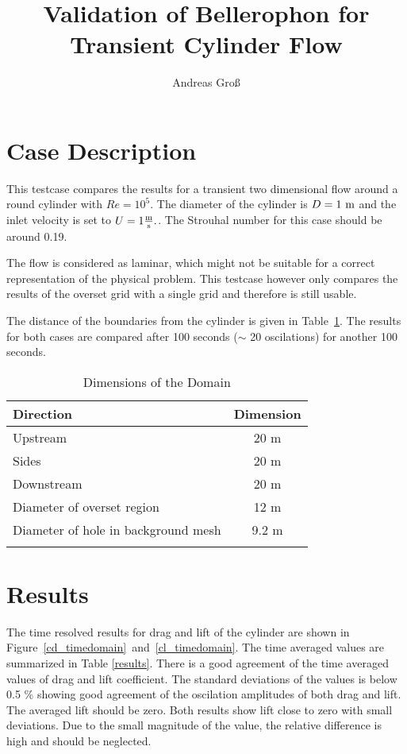 \documentclass[a4paper,10pt]{scrartcl}
\title{Validation of Bellerophon for Transient Cylinder Flow}
\author{Andreas Groß}
\begin{document}
\maketitle

\section{Case Description}
This testcase compares the results for a transient two dimensional flow around
a round cylinder with \(Re=10^5\). The diameter of the cylinder is
\(D=1\ \text m\) and the inlet velocity is set to
\(U=1\frac{\text m}{\text s}.\). The Strouhal number for this case should be
around 0.19.

The flow is considered as laminar, which might not be suitable for a correct
representation of the physical problem. This testcase however only compares the
results of the overset grid with a single grid and therefore is still
usable.

The distance of the boundaries from the cylinder is given in
Table~\ref{domain}. The results for both cases are compared after 100 seconds
(\(\sim\) 20 oscilations) for another 100 seconds.

\begin{table}[!htbp]
 \caption{Dimensions of the Domain}
 \centering
 \begin{tabular}{lc}
  \toprule
  Direction & Dimension \\
  \midrule
  Upstream & 20 m\\
  Sides & 20 m\\
  Downstream & 20 m\\
  Diameter of overset region & 12 m \\
  Diameter of hole in background mesh & 9.2 m \\
  \bottomrule
  \label{domain}
 \end{tabular}
\end{table}


\section{Results}

The time resolved results for drag and lift of the cylinder are shown in
Figure~\ref{cd_timedomain}~and~\ref{cl_timedomain}. The time averaged values
are summarized in Table \ref{results}. There is a good agreement of the time
averaged values of drag and lift coefficient. The standard deviations of the
values is below 0.5 \% showing good agreement of the oscilation amplitudes of
both drag and lift. The averaged lift should be zero. Both results show lift
close to zero with small deviations. Due to the small magnitude of the value,
the relative difference is high and should be neglected.
\end{document}
